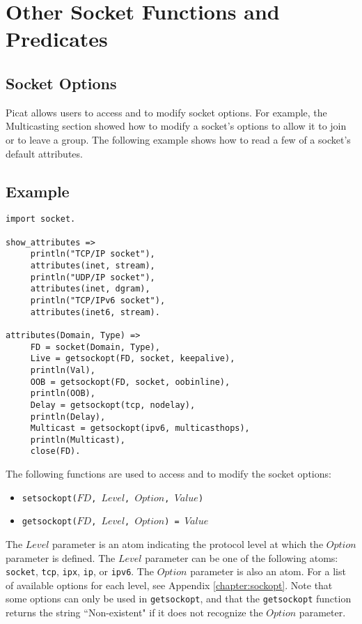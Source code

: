 \section{Other Socket Functions and Predicates}
\subsection{\label{socket_options}Socket Options}
Picat allows users to access and to modify socket options.  For example, the Multicasting section showed how to modify a socket's options to allow it to join or to leave a group.  The following example shows how to read a few of a socket's default attributes.

\subsection*{Example}
\begin{verbatim}
import socket.

show_attributes =>
     println("TCP/IP socket"),
     attributes(inet, stream),
     println("UDP/IP socket"),
     attributes(inet, dgram),
     println("TCP/IPv6 socket"),
     attributes(inet6, stream).

attributes(Domain, Type) =>
     FD = socket(Domain, Type),
     Live = getsockopt(FD, socket, keepalive),
     println(Val),
     OOB = getsockopt(FD, socket, oobinline),
     println(OOB),
     Delay = getsockopt(tcp, nodelay),
     println(Delay),
     Multicast = getsockopt(ipv6, multicasthops),
     println(Multicast),
     close(FD). 
\end{verbatim}

The following functions are used to access and to modify the socket options:
\begin{itemize}
\item \texttt{setsockopt($FD$, $Level$, $Option$, $Value$)} 
\item \texttt{getsockopt($FD$, $Level$, $Option$) = $Value$}
\end{itemize}
The $Level$ parameter is an atom indicating the protocol level at which the $Option$ parameter is defined.  The $Level$ parameter can be one of the following atoms: \texttt{socket}, \texttt{tcp}, \texttt{ipx}, \texttt{ip}, or \texttt{ipv6}.  The $Option$ parameter is also an atom.  For a list of available options for each level, see Appendix \ref{chapter:sockopt}.  Note that some options can only be used in \texttt{getsockopt}, and that the \texttt{getsockopt} function returns the string ``Non-existent" if it does not recognize the $Option$ parameter.

